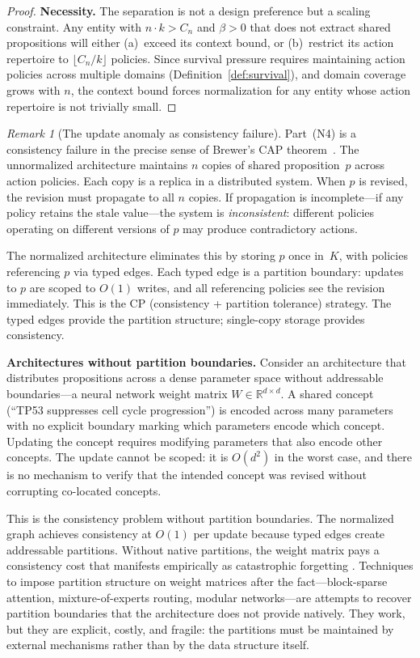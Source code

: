 \documentclass[11pt]{article}
\theoremstyle{definition}
\theoremstyle{remark}
\newtheorem*{remark}{Remark}
\begin{document}
\begin{proof}
\textbf{Necessity.}
The separation is not a design preference but a scaling constraint. Any
entity with $n \cdot k > C_n$ and $\beta > 0$ that does not extract
shared propositions will either (a)~exceed its context bound, or
(b)~restrict its action repertoire to $\lfloor C_n / k \rfloor$
policies. Since survival pressure requires maintaining action policies
across multiple domains (Definition~\ref{def:survival}), and domain
coverage grows with $n$, the context bound forces normalization for any
entity whose action repertoire is not trivially small.
\end{proof}

\begin{remark}[The update anomaly as consistency failure]
\label{rem:consistency}
Part~(N4) is a consistency failure in the precise sense of Brewer's CAP
theorem~\cite{Brewer2000, Gilbert2002}. The unnormalized architecture
maintains $n$ copies of shared proposition~$p$ across action policies.
Each copy is a replica in a distributed system. When $p$ is revised,
the revision must propagate to all $n$ copies. If propagation is
incomplete---if any policy retains the stale value---the system is
\emph{inconsistent}: different policies operating on different versions
of $p$ may produce contradictory actions.

The normalized architecture eliminates this by storing $p$ once in~$K$,
with policies referencing $p$ via typed edges. Each typed edge is a
partition boundary: updates to $p$ are scoped to $O(1)$ writes, and
all referencing policies see the revision immediately. This is the CP
(consistency + partition tolerance) strategy. The typed edges provide
the partition structure; single-copy storage provides consistency.

\textbf{Architectures without partition boundaries.}
Consider an architecture that distributes propositions across a dense
parameter space without addressable boundaries---a neural network weight
matrix $W \in \mathbb{R}^{d \times d}$. A shared concept (``TP53
suppresses cell cycle progression'') is encoded across many parameters
with no explicit boundary marking which parameters encode which
concept. Updating the concept requires modifying parameters that also
encode other concepts. The update cannot be scoped: it is $O(d^2)$ in
the worst case, and there is no mechanism to verify that the intended
concept was revised without corrupting co-located concepts.

This is the consistency problem without partition boundaries. The
normalized graph achieves consistency at $O(1)$ per update because typed
edges create addressable partitions. Without native partitions, the weight
matrix pays a consistency cost that manifests empirically as catastrophic
forgetting \cite{McCloskey1989,Kirkpatrick2017}. Techniques to impose partition structure on weight matrices
after the fact---block-sparse attention, mixture-of-experts routing,
modular networks---are attempts to recover partition boundaries that the
architecture does not provide natively. They work, but they are
explicit, costly, and fragile: the partitions must be maintained by
external mechanisms rather than by the data structure itself.


\end{remark}
\end{document}
